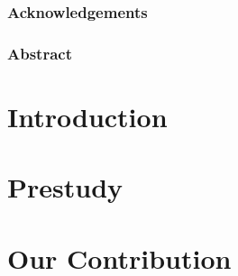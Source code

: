 \documentclass[english, a4paper, 12pt, twoside]{article}
\numberwithin{equation}{section} %
\def\biblio{\clearpage} %
\begin{document}
\def\biblio{} %


\restoregeometry %

\thispagestyle{plain} %
\clearpage\mbox{}\clearpage %

\newpage
\section*{Acknowledgements}
    

\newpage
\section*{Abstract}
    

\newpage
{ %
\tableofcontents
}

\newpage
{ 
\listoffigures}

\newpage
{ 
\listoftables}

\newpage
{} %
\setcounter{page}{1} %

\vspace*{6\baselineskip}
\part{Introduction} %
\label{part:introduction} %

\vspace*{6\baselineskip}
\part{Prestudy}
\label{part:prestudy}


\vspace*{6\baselineskip}
\part{Our Contribution}
\label{part:contribution}

\end{document}
